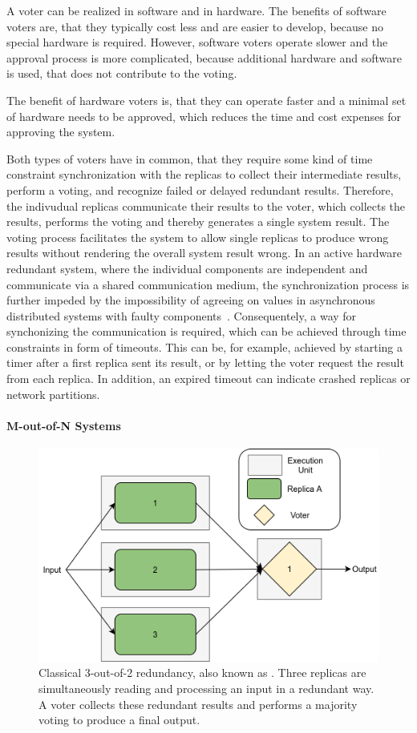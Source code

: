 A voter can be realized in software and in hardware.
The benefits of software voters are, that they typically cost less and are easier to develop, because no special hardware is required.
However, software voters operate slower and the approval process is more complicated, because additional hardware and software is used, that does not contribute to the voting.

The benefit of hardware voters is, that they can operate faster and a minimal set of hardware needs to be approved, which reduces the time and cost expenses for approving the system.

Both types of voters have in common, that they require some kind of time constraint synchronization with the replicas to collect their intermediate results, perform a voting, and recognize failed or delayed redundant results.
Therefore, the indivudual replicas communicate their results to the voter, which collects the results, performs the voting and thereby generates a single system result.
The voting process facilitates the system to allow single replicas to produce wrong results without rendering the overall system result wrong.
In an active hardware redundant system, where the individual components are independent and communicate via a shared communication medium, the synchronization process is further impeded by the impossibility of agreeing on values in asynchronous distributed systems with faulty components~\cite{FLPProblemConsensus}.
Consequentely, a way for synchonizing the communication is required, which can be achieved through time constraints in form of timeouts.
This can be, for example, achieved by starting a timer after a first replica sent its result, or by letting the voter request the result from each replica.
In addition, an expired timeout can indicate crashed replicas or network partitions.

\paragraph{M-out-of-N Systems}
\begin{figure}[!hb]
	\centering
	\includegraphics[width=0.75\linewidth]{images/Classical2OO3}
	\caption{Classical 3-out-of-2 redundancy, also known as . Three replicas are simultaneously reading and processing an input in a redundant way. A voter collects these redundant results and performs a majority voting to produce a final output.}
	\label{fig:Classical2OO3}
\end{figure}

